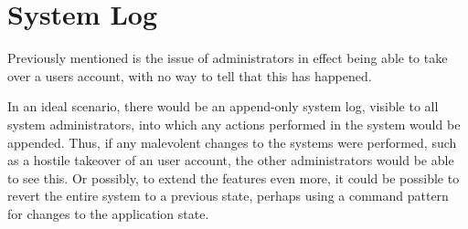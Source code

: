 \documentclass[../../master.tex]{subfiles}
\begin{document}
\section{System Log}
Previously mentioned is the issue of administrators in effect being able to take over a users account, with no way to tell that this has happened.

In an ideal scenario, there would be an append-only system log, visible to all system administrators, into which any actions performed in the system would be appended.
Thus, if any malevolent changes to the systems were performed, such as a hostile takeover of an user account, the other administrators would be able to see this.
Or possibly, to extend the features even more, it could be possible to revert the entire system to a previous state, perhaps using a command pattern for changes to the application state.
\end{document}
